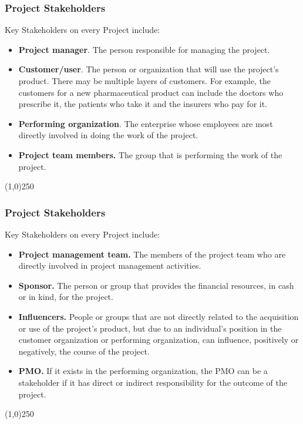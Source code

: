 \begin{frame}
\frametitle{Project Stakeholders}
Key Stakeholders on every Project include:\\
\begin{itemize}
	\item \textbf{Project manager}. The person responsible for managing the project. 
	\item \textbf{Customer/user}. The person or organization that will use the project's product. There may be multiple layers of customers. For example, the customers for a new pharmaceutical product can include the doctors who prescribe it, the patients who take it and the insurers who pay for it.
	\item \textbf{Performing organization}. The enterprise whose employees are most directly involved in doing the work of the project. 
	\item \textbf{Project team members.} The group that is performing the work of the project. 
\end{itemize}
\end{frame}
\begin{center}\line(1,0){250}\end{center}


\begin{frame}
\frametitle{Project Stakeholders}
Key Stakeholders on every Project include:\\
\begin{itemize}
	\item \textbf{Project management team.} The members of the project team who are directly involved in project management activities. 
	\item \textbf{Sponsor.} The person or group that provides the financial resources, in cash or in kind, for the project. 
	\item \textbf{Influencers.} People or groups that are not directly related to the acquisition or use of the project's product, but due to an individual's position in the customer organization or performing organization, can influence, positively or negatively, the course of the project. 
	\item \textbf{PMO.} If it exists in the performing organization, the PMO can be a stakeholder if it has direct or indirect responsibility for the outcome of the project. 
\end{itemize}
\end{frame}
\begin{center}\line(1,0){250}\end{center}





